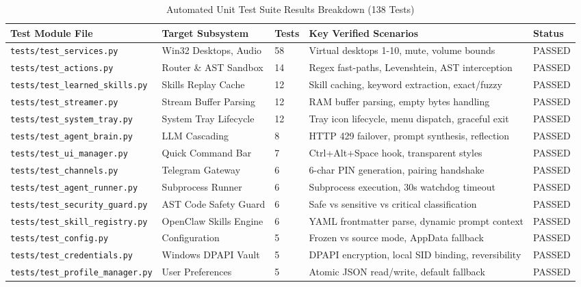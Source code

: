 \documentclass[12pt,letterpaper,oneside]{report}
\begin{document}
\begin{table}[H]
\centering
\caption{Automated Unit Test Suite Results Breakdown (138 Tests)}
\label{tab:unit_test_summary}
\begin{tabularx}{\textwidth}{|l|l|l|X|l|}
\hline
\textbf{Test Module File} & \textbf{Target Subsystem} & \textbf{Tests} & \textbf{Key Verified Scenarios} & \textbf{Status}\\ \hline
\texttt{tests/test\_services.py} & Win32 Desktops, Audio & 58 & Virtual desktops 1-10, mute, volume bounds & PASSED\\ \hline
\texttt{tests/test\_actions.py} & Router \& AST Sandbox & 14 & Regex fast-paths, Levenshtein, AST interception & PASSED\\ \hline
\texttt{tests/test\_learned\_skills.py} & Skills Replay Cache & 12 & Skill caching, keyword extraction, exact/fuzzy & PASSED\\ \hline
\texttt{tests/test\_streamer.py} & Stream Buffer Parsing & 12 & RAM buffer parsing, empty bytes handling & PASSED\\ \hline
\texttt{tests/test\_system\_tray.py} & System Tray Lifecycle & 12 & Tray icon lifecycle, menu dispatch, graceful exit & PASSED\\ \hline
\texttt{tests/test\_agent\_brain.py} & LLM Cascading & 8 & HTTP 429 failover, prompt synthesis, reflection & PASSED\\ \hline
\texttt{tests/test\_ui\_manager.py} & Quick Command Bar & 7 & Ctrl+Alt+Space hook, transparent styles & PASSED\\ \hline
\texttt{tests/test\_channels.py} & Telegram Gateway & 6 & 6-char PIN generation, pairing handshake & PASSED\\ \hline
\texttt{tests/test\_agent\_runner.py} & Subprocess Runner & 6 & Subprocess execution, 30s watchdog timeout & PASSED\\ \hline
\texttt{tests/test\_security\_guard.py} & AST Code Safety Guard & 6 & Safe vs sensitive vs critical classification & PASSED\\ \hline
\texttt{tests/test\_skill\_registry.py} & OpenClaw Skills Engine & 6 & YAML frontmatter parse, dynamic prompt context & PASSED\\ \hline
\texttt{tests/test\_config.py} & Configuration & 5 & Frozen vs source mode, AppData fallback & PASSED\\ \hline
\texttt{tests/test\_credentials.py} & Windows DPAPI Vault & 5 & DPAPI encryption, local SID binding, reversibility & PASSED\\ \hline
\texttt{tests/test\_profile\_manager.py} & User Preferences & 5 & Atomic JSON read/write, default fallback & PASSED\\ \hline
\end{tabularx}
\end{table}
\end{document}

